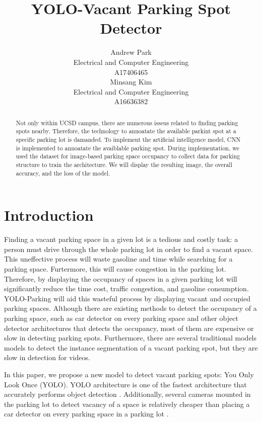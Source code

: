 \documentclass{article}
\title{YOLO-Vacant Parking Spot Detector}
\author{%
  Andrew Park \\
  Electrical and Computer Engineering\\
  A17406465\\
  \And
  Minsang Kim \\
  Electrical and Computer Engineering\\
  A16636382 \\
}
\begin{document}
\maketitle

\begin{abstract}
    Not only within UCSD campus, there are numerous isseus related to finding
    parking spots nearby. Therefore, the technology to annoatate the available parkint
    spot at a specific parking lot is damanded. To implement the artificial intelligence
    model, CNN is implemented to annoatate the avaiblable parking spot. During
    implementation, we used the dataset for image-based parking space occupancy to collect data for parking structure
    to train the architecture. We will display the resulting image, the overall accuracy,
    and the loss of the model. 
    

\end{abstract}

\section{Introduction}

Finding a vacant parking space in a given lot is a tedious and costly task: a person must drive through the whole parking lot in order to find a vacant space. This uneffective process will 
waste gasoline and time while searching for a parking space. Furtermore, this will cause congestion in the parking lot. Therefore, by displaying the occupancy of spaces in a given parking lot
will significantly reduce the time cost, traffic congestion, and gasoline consumption. YOLO-Parking will aid this wasteful process by displaying vacant and
occupied parking spaces. Although there are existing methods to detect the occupancy of a parking space, such as car detector on every parking space and other object detector architectures 
that detects the occupancy, most of them are expensive or slow in detecting parking spots\cite{DBLP:journals/corr/abs-2107-12207}. Furthermore, there are several traditional models  models 
to detect the instance segmentation of a vacant parking spot, but they are slow in detection for videos. 

In this paper, we propose a new model to detect vacant parking spots: You Only Look Once (YOLO). YOLO architecture is one of the fastest architecture that accurately performs object detection \cite{redmon2016look}. 
Additionally, several cameras mounted in the parking lot to detect vacancy of a space is relatively cheaper than placing a car detector on every parking space in a parking lot \cite{DBLP:journals/corr/abs-2107-12207}. 
\end{document}
